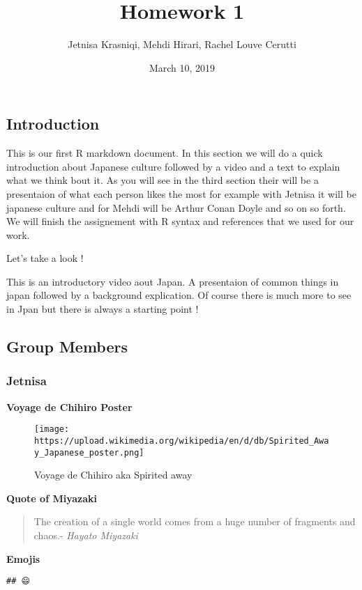 \documentclass[]{article}
\title{Homework 1}
\author{Jetnisa Krasniqi, Mehdi Hirari, Rachel Louve Cerutti}
\date{March 10, 2019}
\begin{document}
\maketitle

\subsection{Introduction}\label{introduction}

This is our first R markdown document. In this section we will do a
quick introduction about Japanese culture followed by a video and a text
to explain what we think bout it. As you will see in the third section
their will be a presentaion of what each person likes the most for
example with Jetnisa it will be japanese culture and for Mehdi will be
Arthur Conan Doyle and so on so forth. We will finish the assignement
with R syntax and references that we used for our work.

Let's take a look !

This is an introductory video aout Japan. A presentaion of common things
in japan followed by a background explication. Of course there is much
more to see in Jpan but there is always a starting point !

\subsection{Group Members}\label{group-members}

\subsubsection{Jetnisa}\label{jetnisa}

\textbf{Voyage de Chihiro Poster}

\begin{figure}
\centering
\texttt{[image: https://upload.wikimedia.org/wikipedia/en/d/db/Spirited\_Away\_Japanese\_poster.png]}
\caption{Voyage de Chihiro aka Spirited away}
\end{figure}

\textbf{Quote of Miyazaki}

\begin{quote}
The creation of a single world comes from a huge number of fragments and
chaos.- \emph{Hayato Miyazaki}
\end{quote}

\textbf{Emojis}

\begin{verbatim}
## 😄
\end{verbatim}
\end{document}
